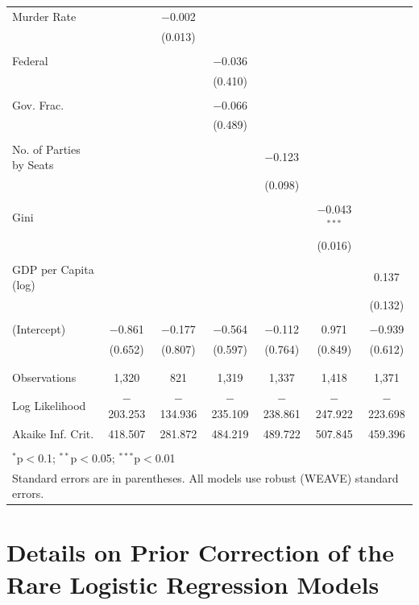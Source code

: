 \documentclass[a4paper]{article}\usepackage[]{graphicx}\usepackage[]{color}
\begin{document}
\begin{table}[H]
\begin{center}
{\begin{tabular}{@{\extracolsep{5pt}}lcccccc}
 Murder Rate &  & $-$0.002 &  &  &  &  \\ 
  &  & (0.013) &  &  &  &  \\ 
  & & & & & & \\ 
 Federal &  &  & $-$0.036 &  &  &  \\ 
  &  &  & (0.410) &  &  &  \\ 
  & & & & & & \\ 
 Gov. Frac. &  &  & $-$0.066 &  &  &  \\ 
  &  &  & (0.489) &  &  &  \\ 
  & & & & & & \\ 
 No. of Parties by Seats &  &  &  & $-$0.123 &  &  \\ 
  &  &  &  & (0.098) &  &  \\ 
  & & & & & & \\ 
 Gini &  &  &  &  & $-$0.043$^{***}$ &  \\ 
  &  &  &  &  & (0.016) &  \\ 
  & & & & & & \\ 
 GDP per Capita (log) &  &  &  &  &  & 0.137 \\ 
  &  &  &  &  &  & (0.132) \\ 
  & & & & & & \\ 
 (Intercept) & $-$0.861 & $-$0.177 & $-$0.564 & $-$0.112 & 0.971 & $-$0.939 \\ 
  & (0.652) & (0.807) & (0.597) & (0.764) & (0.849) & (0.612) \\ 
  & & & & & & \\ 
\hline \\[-1.8ex] 
Observations & 1,320 & 821 & 1,319 & 1,337 & 1,418 & 1,371 \\ 
Log Likelihood & $-$203.253 & $-$134.936 & $-$235.109 & $-$238.861 & $-$247.922 & $-$223.698 \\ 
Akaike Inf. Crit. & 418.507 & 281.872 & 484.219 & 489.722 & 507.845 & 459.396 \\ 
\hline 
\hline \\[-1.8ex] 
\multicolumn{7}{l}{$^{*}$p$<$0.1; $^{**}$p$<$0.05; $^{***}$p$<$0.01} \\ 
\multicolumn{7}{l}{Standard errors are in parentheses. All models use robust (WEAVE) standard errors.} \\ 
\end{tabular} 

}
\end{center}
\end{table}

\section*{Details on Prior Correction of the Rare Logistic Regression Models}
\end{document}
